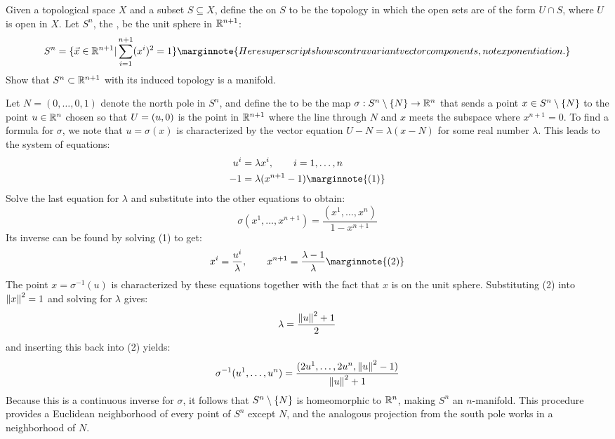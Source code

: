 \documentclass[10pt]{article}
\begin{document}
\begin{example}\label{b1e3}
	Given a topological space $X$ and a subset $S \subseteq X$, define the
	 on $S$ to be the topology in which the open sets are
	of the form $U \cap S$, where $U$ is open in $X$. Let $S^n$, the
	, be the unit sphere in $\mathbb{R}^{n+1}$:
	$$
		S^n = \br{\vec{x} \in \R^{n+1} | \sum_{i=1}^{n+1}\p{x^i}^2=1}
		\marginnote{Here superscript shows contravariant
vector components, not exponentiation.}
	$$
	Show that $S^n \subset \mathbb{R}^{n+1}$ with its induced topology is a manifold.
\end{example}
\sol Let $N = (0,\dots,0,1)$ denote the north pole in $S^n$, and define the
 to be the map $\sigma:S^n\setminus\lbrace N\rbrace\to\mathbb{R}^n$
that sends a point $x \in S^n\setminus\lbrace N\rbrace$ to the point $u\in\mathbb{R}^n$ chosen so that
$U=\lparen u, 0\rparen$ is the point in $\mathbb{R}^{n+1}$ where the line through $N$ and $x$ meets the
subspace where $x^{n+1}=0.$
To find a formula for $\sigma$, we note that $u=\sigma(x)$
is characterized by the vector equation $U-N=\lambda(x-N)$ for some real number $\lambda$.
This leads to the system of equations:
$$
\begin{aligned}
	u^i &= \lambda x^i, \qquad i=1,\dots,n\\
	-1 &= \lambda(x^{n+1} - 1) \marginnote{(1)}
\end{aligned}
$$
Solve the last equation for $\lambda$ and substitute into the other equations to obtain:
$$
	\sigma(x^1,\dots,x^{n+1}) = \frac{(x^1,\dots,x^n)}{1-x^{n+1}}
$$
Its inverse can be found by solving (1) to get:
$$
	x^i = \frac{u^i}{\lambda}, \qquad x^{n+1} = \frac{\lambda-1}{\lambda}
	\marginnote{(2)}
$$
The point $x=\sigma^{-1}(u)$ is characterized by these equations together with the
fact that $x$ is on the unit sphere. Substituting (2) into $\norm{x}^2=1$ and solving
for $\lambda$ gives:
$$
	\lambda=\frac{\norm{u}^2+1}{2}
$$
and inserting this back into (2) yields:
$$
	\sigma^{-1}(u^1,\dots,u^n)=\frac{(2u^1,\dots,2u^n,\norm{u}^2-1)}{\norm{u}^2+1}
$$
Because this is a continuous inverse for $\sigma$, it follows that $S^n\setminus\lbrace N\rbrace$ is homeomorphic to $\mathbb{R}^n$, making $S^n$ an $n$-manifold. This procedure provides a Euclidean neighborhood of
every point of $S^n$ except $N$, and the analogous projection from the south pole
works in a neighborhood of $N$.
\end{document}
